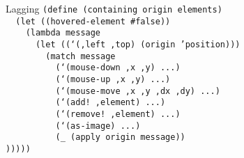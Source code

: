 \begin{frame}{Lagging}
  \footnotesize
  \texttt{(define (containing origin elements)\\
    \ \ (let ((hovered-element \#false))\\
    \ \ \ \ (lambda message\\
    \ \ \ \ \ \ (let ((`(,left ,top) (origin 'position)))\\
    \ \ \ \ \ \ \ \ (match message\\
    \ \ \ \ \ \ \ \ \ \ (`(mouse-down ,x ,y) ...)\\
    \ \ \ \ \ \ \ \ \ \ (`(mouse-up ,x ,y) ...)\\
    \ \ \ \ \ \ \ \ \ \ (`(mouse-move ,x ,y ,dx ,dy) ...)\\
    \ \ \ \ \ \ \ \ \ \ (`(add!\ ,element) ...)\\
    \ \ \ \ \ \ \ \ \ \ (`(remove!\ ,element) ...)\\
    \ \ \ \ \ \ \ \ \ \ (`(as-image) ...)\\
    \ \ \ \ \ \ \ \ \ \ (\_ (apply origin message))\\
    )))))\\
    \ \\
    \ \\
    \ \\
    \ \\
    \ \\
    \ \\
    \ \\
    \ \\
    \ \\
    \ \\
    \ 
  }
\end{frame}


